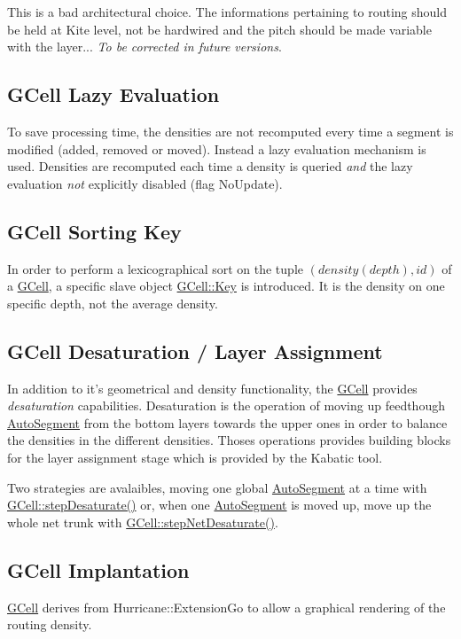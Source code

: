 This is a bad architectural choice. The informations pertaining to routing should be held at Kite level, not be hardwired and the pitch should be made variable with the layer... {\itshape To be corrected in future versions}.\hypertarget{classKatabatic_1_1GCell_secGCellLazyEvaluation}{}\subsection{G\-Cell Lazy Evaluation}\label{classKatabatic_1_1GCell_secGCellLazyEvaluation}
To save processing time, the densities are not recomputed every time a segment is modified (added, removed or moved). Instead a lazy evaluation mechanism is used. Densities are recomputed each time a density is queried {\itshape and} the lazy evaluation {\itshape not} explicitly disabled (flag No\-Update).\hypertarget{classKatabatic_1_1GCell_secGCellSortingKey}{}\subsection{G\-Cell Sorting Key}\label{classKatabatic_1_1GCell_secGCellSortingKey}
In order to perform a lexicographical sort on the tuple $(density(depth),id)$ of a \hyperlink{classKatabatic_1_1GCell}{G\-Cell}, a specific slave object \hyperlink{classKatabatic_1_1GCell_1_1Key}{G\-Cell\-::\-Key} is introduced. It is the density on one specific depth, not the average density.\hypertarget{classKatabatic_1_1GCell_secGCellDesaturation}{}\subsection{G\-Cell Desaturation / Layer Assignment}\label{classKatabatic_1_1GCell_secGCellDesaturation}
In addition to it's geometrical and density functionality, the \hyperlink{classKatabatic_1_1GCell}{G\-Cell} provides {\itshape desaturation} capabilities. Desaturation is the operation of moving up feedthough \hyperlink{classKatabatic_1_1AutoSegment}{Auto\-Segment} from the bottom layers towards the upper ones in order to balance the densities in the different densities. Thoses operations provides building blocks for the layer assignment stage which is provided by the Kabatic tool.

Two strategies are avalaibles, moving one global \hyperlink{classKatabatic_1_1AutoSegment}{Auto\-Segment} at a time with \hyperlink{classKatabatic_1_1GCell_a1256c28423a9a260d320e25b3fc1bf57}{G\-Cell\-::step\-Desaturate()} or, when one \hyperlink{classKatabatic_1_1AutoSegment}{Auto\-Segment} is moved up, move up the whole net trunk with \hyperlink{classKatabatic_1_1GCell_aab5b30c49b0453db495337931cf284a9}{G\-Cell\-::step\-Net\-Desaturate()}.\hypertarget{classKatabatic_1_1GCell_secGCellImplantation}{}\subsection{G\-Cell Implantation}\label{classKatabatic_1_1GCell_secGCellImplantation}
\hyperlink{classKatabatic_1_1GCell}{G\-Cell} derives from Hurricane\-::\-Extension\-Go to allow a graphical rendering of the routing density. 

